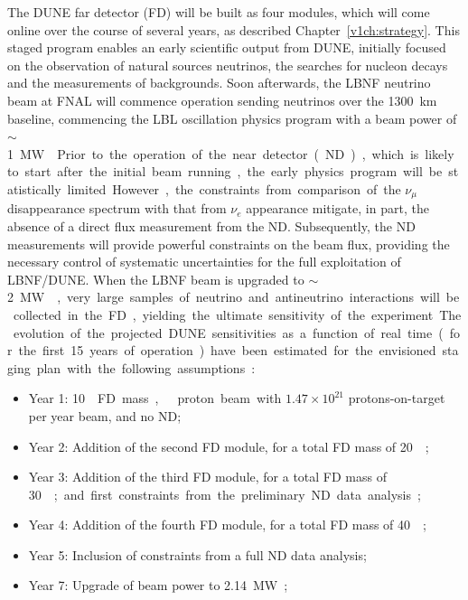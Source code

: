 The DUNE far detector (FD) will be built as four  modules, which will
come online over the course of several years, as described Chapter~\ref{v1ch:strategy}. 
This staged program enables an early scientific output from DUNE, 
initially focused on the observation of natural
sources neutrinos, the searches for nucleon decays and the
measurements of backgrounds. Soon afterwards, the LBNF neutrino
beam at FNAL will commence operation sending neutrinos over the 1300~km
baseline, commencing the LBL oscillation physics program with a beam power of $\sim$\SI{1}\MW{}. 
Prior to the operation of the near detector (ND), which
is likely to start after the initial beam running, the early physics program
will be statistically limited. However, the constraints from comparison of the $\nu_\mu$
disappearance spectrum with that from $\nu_e$ appearance mitigate, in part,
the absence of a direct flux measurement from the ND. Subsequently, the ND
measurements will provide powerful constraints on the beam flux, providing the
necessary control of systematic uncertainties for the full exploitation of LBNF/DUNE. 
When the LBNF beam is upgraded to $\sim$\SI{2}\MW{}, very large samples of neutrino and antineutrino interactions
will be collected in the FD, yielding the ultimate sensitivity of
the experiment.


The evolution of the projected DUNE sensitivities as a function of real time
(for the first \num{15} years of operation) have been estimated for the envisioned staging plan
with the following assumptions:
\begin{itemize}
\item Year 1: \SI{10}\kt{} FD mass,  
  proton beam with $1.47 \times 10^{21}$ protons-on-target per year
  beam, and no ND;
\item Year 2: Addition of the second  FD module, for a total FD mass of
  \SI{20}\kt;
\item Year 3: Addition of the third  FD module, for a total FD mass of
  \SI{30}\kt; and first constraints from the preliminary ND data analysis;
\item Year 4: Addition of the fourth  FD module, for a total FD mass of
  \SI{40}\kt;
\item Year 5: Inclusion of constraints from a full ND data analysis; 
 \item Year 7: Upgrade of beam power to \SI{2.14}\MW; %
\end{itemize}

